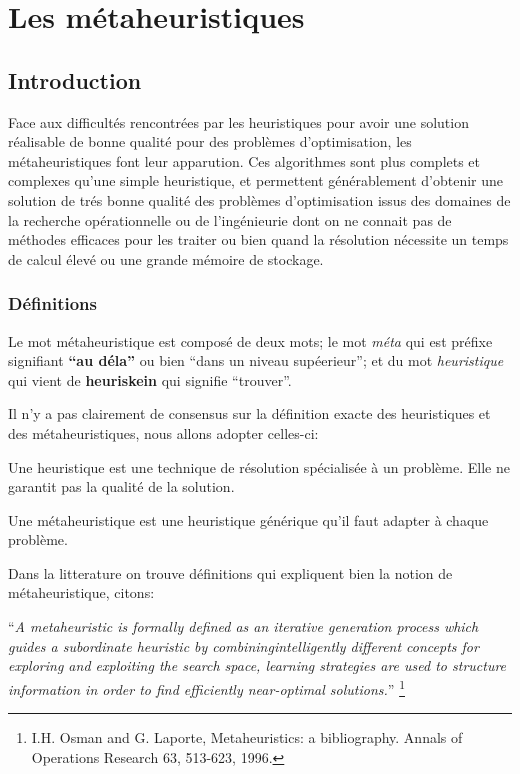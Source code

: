 \documentclass[a4paper,11pt,oneside]{report}
\theoremstyle{plain}
\newcommand{\0}{/ \! \! \! 0}
\theoremstyle{plain}
\begin{document}
\chapter{Les m\'etaheuristiques}
\section{Introduction}
Face aux difficult\'es rencontr\'ees par les heuristiques pour avoir une solution r\'ealisable de bonne qualit\'e pour des probl\`emes d'optimisation, 
les m\'etaheuristiques font leur apparution. Ces algorithmes sont plus complets et complexes qu'une simple heuristique, et permettent g\'en\'erablement 
d'obtenir une solution de tr\'es bonne qualit\'e des probl\`emes d'optimisation issus des domaines de la recherche op\'erationnelle ou de l'ing\'enieurie 
dont on ne connait pas de m\'ethodes efficaces pour les traiter ou bien quand la r\'esolution n\'ecessite un temps de calcul \'elev\'e ou une grande 
m\'emoire de stockage.
\subsection{D\'efinitions}
Le mot m\'etaheuristique est compos\'e de deux mots; le mot {\it m\'eta} qui est pr\'efixe signifiant {\bf ``au d\'ela''} ou bien ``dans un niveau 
sup\'eerieur''; et du mot {\it heuristique} qui vient de {\bf heuriskein} qui signifie ``trouver''.

Il n'y a pas clairement de consensus sur la d\'efinition exacte des heuristiques et des m\'etaheuristiques, nous allons adopter celles-ci:

  Une heuristique est une technique de r\'esolution sp\'ecialis\'ee \`a un probl\`eme. Elle ne garantit pas la qualit\'e de la solution.
 
  Une m\'etaheuristique est une heuristique g\'en\'erique qu'il faut adapter \`a chaque probl\`eme.
 
 Dans la litterature on trouve d\'efinitions qui expliquent bien la notion de m\'etaheuristique, citons:
 
 ``{\it A metaheuristic is formally defined as an iterative generation process which guides a subordinate heuristic by combiningintelligently different
 concepts for exploring and exploiting the search space, learning strategies are used to structure information in order to find efficiently
 near-optimal solutions.}'' \footnote{I.H. Osman and G. Laporte, Metaheuristics: a bibliography. Annals of Operations Research 63, 513-623,
 1996.}\vspace{0.5cm}
 
\end{document}
